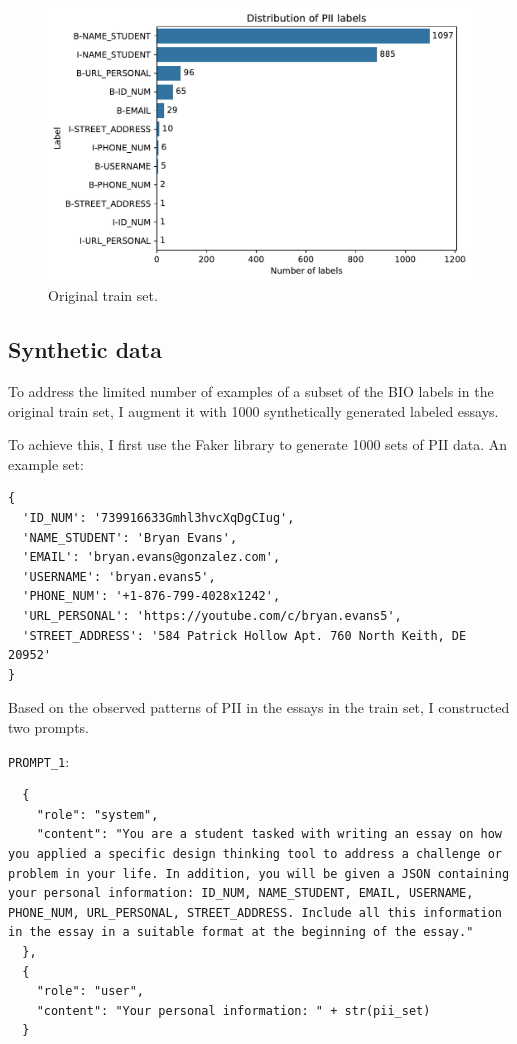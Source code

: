 \documentclass[11pt]{article}
\begin{document}
\begin{figure}[H]
  \centering
  \includegraphics[width=\columnwidth]{images/label_distribution.pdf}
  \caption{Original train set.}
  \label{fig:label_distribution_original_train_set}
\end{figure}

\subsection{Synthetic data}

To address the limited number of examples of a subset of the BIO labels in the original train set, I augment it with 1000 synthetically generated labeled essays.

To achieve this, I first use the Faker library \cite{Faraglia2023Faker} to generate 1000 sets of PII data. An example set:

\begin{lstlisting}
{
  'ID_NUM': '739916633Gmhl3hvcXqDgCIug',
  'NAME_STUDENT': 'Bryan Evans',
  'EMAIL': 'bryan.evans@gonzalez.com',
  'USERNAME': 'bryan.evans5',
  'PHONE_NUM': '+1-876-799-4028x1242',
  'URL_PERSONAL': 'https://youtube.com/c/bryan.evans5',
  'STREET_ADDRESS': '584 Patrick Hollow Apt. 760 North Keith, DE 20952'
}
\end{lstlisting}

Based on the observed patterns of PII in the essays in the train set, I constructed two prompts.

\verb|PROMPT_1|:

\begin{lstlisting}
  {
    "role": "system",
    "content": "You are a student tasked with writing an essay on how you applied a specific design thinking tool to address a challenge or problem in your life. In addition, you will be given a JSON containing your personal information: ID_NUM, NAME_STUDENT, EMAIL, USERNAME, PHONE_NUM, URL_PERSONAL, STREET_ADDRESS. Include all this information in the essay in a suitable format at the beginning of the essay."
  },
  {
    "role": "user",
    "content": "Your personal information: " + str(pii_set)
  }
\end{lstlisting}
\end{document}
